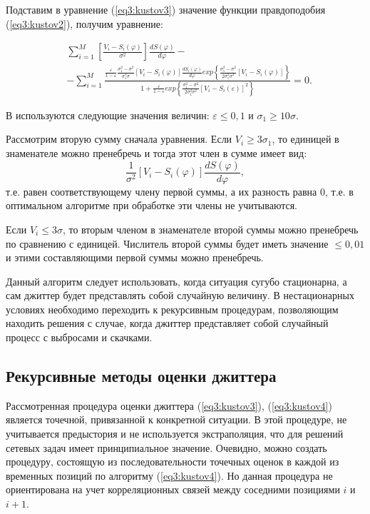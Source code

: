 Подставим в уравнение (\ref{eq3:kustov3}) значение функции правдоподобия (\ref{eq3:kustov2}), получим уравнение:

\begin{equation}\label{eq3:kustov4}
\begin{split}
&\sum_{i=1}^M\left[\frac{V_i-S_i(\varphi)}{\sigma^2}\right]\frac{dS(\varphi)}{d\varphi}-\\
&-\sum_{i=1}^M\frac{\frac{\varepsilon}{1-\varepsilon}\frac{\sigma_1^2-\sigma^2}{\sigma_1^3\sigma}[V_i-S_i(\varphi)]\frac{dS_i(\varphi)}{d\varphi}exp\left\{\frac{\sigma_1^2-\sigma^2}{2\sigma_1^2\sigma^2}[V_i-S_i(\varphi)]\right\}}{1+\frac{\varepsilon}{1-\varepsilon}exp\left\{\frac{\sigma_1^2-\sigma^2}{2\sigma_1^2\sigma^2}[V_i-S_i(\varepsilon)]^2\right\}}=0.
\end{split}
\end{equation}

В \cite{kustova} используются следующие значения величин: $\varepsilon\leq0,1$ и $\sigma_1\geq10\sigma$.

Рассмотрим вторую сумму сначала уравнения. Если $V_i\geq3\sigma_1$, то единицей в знаменателе можно пренебречь и тогда этот член в сумме имеет вид:
\begin{equation}\label{eq3:kustov5}
\frac{1}{\sigma^2}[V_i-S_i(\varphi)]\frac{dS(\varphi)}{d\varphi},
\end{equation}
\noindent т.е. равен соответствующему члену первой суммы, а их разность равна 0, т.е. в оптимальном алгоритме при обработке эти члены не учитываются.

Если $V_i\leq3\sigma$, то вторым членом в знаменателе второй суммы можно пренебречь по сравнению с единицей. Числитель второй суммы будет иметь значение $\leq0,01$ и этими составляющими первой суммы можно пренебречь.

Данный алгоритм следует использовать, когда ситуация сугубо стационарна, а сам джиттер будет представлять собой случайную величину.
В нестационарных условиях необходимо переходить к рекурсивным процедурам, позволяющим находить решения с случае, когда джиттер представляет собой случайный процесс с выбросами и скачками.

\subsection{Рекурсивные методы оценки джиттера}

Рассмотренная процедура оценки джиттера (\ref{eq3:kustov3}), (\ref{eq3:kustov4}) является точечной, привязанной к конкретной ситуации. В этой процедуре, не учитывается предыстория и не используется экстраполяция, что для решений сетевых задач имеет принципиальное значение. 
Очевидно, можно создать процедуру, состоящую из последовательности точечных оценок в каждой из временных позиций по алгоритму (\ref{eq3:kustov4}).
Но данная процедура не ориентирована на учет корреляционных связей между соседними позициями $i$ и $i+1$.

